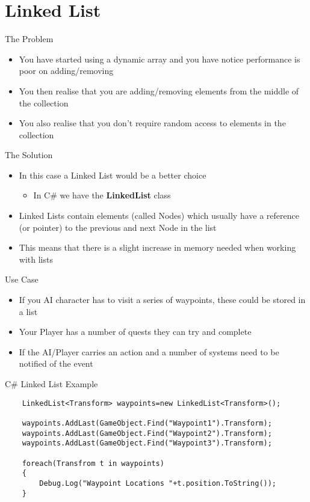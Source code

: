 \part{Linked List}
\frame{\partpage}

\begin{frame}{The Problem}
	\begin{itemize}
		\pause \item You have started using a dynamic array and you have notice performance is poor on adding/removing
		 \pause \item You then realise that you are adding/removing elements from the middle of the collection
		 \pause \item You also realise that you don't require random access to elements in the collection
	\end{itemize}
\end{frame}

\begin{frame}{The Solution}
	\begin{itemize}
		\pause \item In this case a Linked List would be a better choice
		\begin{itemize}
			\pause \item In C\# we have the \textbf{LinkedList} class
		\end{itemize}
		\pause \item Linked Lists contain elements (called Nodes) which usually have a reference (or pointer) to the previous and next Node in the list
		\pause \item This means that there is a slight increase in memory needed when working with lists
	\end{itemize}
\end{frame}

\begin{frame}{Use Case}
	\begin{itemize}
		\pause \item If you AI character has to visit a series of waypoints, these could be stored in a list
		\pause \item Your Player has a number of quests they can try and complete
		\pause \item If the AI/Player carries an action and a number of systems need to be notified of the event 
	\end{itemize}
\end{frame}

\begin{frame}[fragile]{C\# Linked List
Example}
\begin{lstlisting}
	LinkedList<Transform> waypoints=new LinkedList<Transform>();
	
	waypoints.AddLast(GameObject.Find("Waypoint1").Transform);
	waypoints.AddLast(GameObject.Find("Waypoint2").Transform);
	waypoints.AddLast(GameObject.Find("Waypoint3").Transform);
	
	foreach(Transfrom t in waypoints)
	{
		Debug.Log("Waypoint Locations "+t.position.ToString());
	}
\end{lstlisting}
\end{frame}

